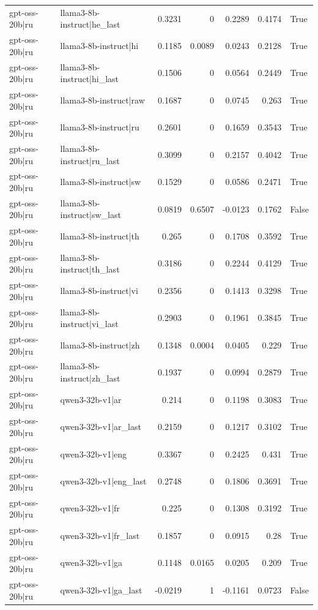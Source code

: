 \begin{table}
\begin{tabular}{l l r r r r l}
gpt-oss-20b|ru & llama3-8b-instruct|he_last & 0.3231 & 0 & 0.2289 & 0.4174 & True \\
gpt-oss-20b|ru & llama3-8b-instruct|hi & 0.1185 & 0.0089 & 0.0243 & 0.2128 & True \\
gpt-oss-20b|ru & llama3-8b-instruct|hi_last & 0.1506 & 0 & 0.0564 & 0.2449 & True \\
gpt-oss-20b|ru & llama3-8b-instruct|raw & 0.1687 & 0 & 0.0745 & 0.263 & True \\
gpt-oss-20b|ru & llama3-8b-instruct|ru & 0.2601 & 0 & 0.1659 & 0.3543 & True \\
gpt-oss-20b|ru & llama3-8b-instruct|ru_last & 0.3099 & 0 & 0.2157 & 0.4042 & True \\
gpt-oss-20b|ru & llama3-8b-instruct|sw & 0.1529 & 0 & 0.0586 & 0.2471 & True \\
gpt-oss-20b|ru & llama3-8b-instruct|sw_last & 0.0819 & 0.6507 & -0.0123 & 0.1762 & False \\
gpt-oss-20b|ru & llama3-8b-instruct|th & 0.265 & 0 & 0.1708 & 0.3592 & True \\
gpt-oss-20b|ru & llama3-8b-instruct|th_last & 0.3186 & 0 & 0.2244 & 0.4129 & True \\
gpt-oss-20b|ru & llama3-8b-instruct|vi & 0.2356 & 0 & 0.1413 & 0.3298 & True \\
gpt-oss-20b|ru & llama3-8b-instruct|vi_last & 0.2903 & 0 & 0.1961 & 0.3845 & True \\
gpt-oss-20b|ru & llama3-8b-instruct|zh & 0.1348 & 0.0004 & 0.0405 & 0.229 & True \\
gpt-oss-20b|ru & llama3-8b-instruct|zh_last & 0.1937 & 0 & 0.0994 & 0.2879 & True \\
gpt-oss-20b|ru & qwen3-32b-v1|ar & 0.214 & 0 & 0.1198 & 0.3083 & True \\
gpt-oss-20b|ru & qwen3-32b-v1|ar_last & 0.2159 & 0 & 0.1217 & 0.3102 & True \\
gpt-oss-20b|ru & qwen3-32b-v1|eng & 0.3367 & 0 & 0.2425 & 0.431 & True \\
gpt-oss-20b|ru & qwen3-32b-v1|eng_last & 0.2748 & 0 & 0.1806 & 0.3691 & True \\
gpt-oss-20b|ru & qwen3-32b-v1|fr & 0.225 & 0 & 0.1308 & 0.3192 & True \\
gpt-oss-20b|ru & qwen3-32b-v1|fr_last & 0.1857 & 0 & 0.0915 & 0.28 & True \\
gpt-oss-20b|ru & qwen3-32b-v1|ga & 0.1148 & 0.0165 & 0.0205 & 0.209 & True \\
gpt-oss-20b|ru & qwen3-32b-v1|ga_last & -0.0219 & 1 & -0.1161 & 0.0723 & False \\

\end{tabular}
\end{table}
